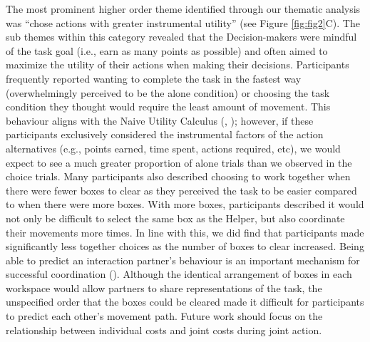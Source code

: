 \documentclass[
  man,
  floatsintext,
  longtable,
  nolmodern,
  notxfonts,
  notimes,
  colorlinks=true,linkcolor=blue,citecolor=blue,urlcolor=blue]{apa7}
\begin{document}
The most prominent higher order theme identified through our thematic
analysis was ``chose actions with greater instrumental utility'' (see
Figure \ref{fig:fig2}C). The sub themes within this category revealed
that the Decision-makers were mindful of the task goal (i.e., earn as
many points as possible) and often aimed to maximize the utility of
their actions when making their decisions. Participants frequently
reported wanting to complete the task in the fastest way (overwhelmingly
perceived to be the alone condition) or choosing the task condition they
thought would require the least amount of movement. This behaviour
aligns with the Naive Utility Calculus
(,
); however, if these participants
exclusively considered the instrumental factors of the action
alternatives (e.g., points earned, time spent, actions required, etc),
we would expect to see a much greater proportion of alone trials than we
observed in the choice trials. Many participants also described choosing
to work together when there were fewer boxes to clear as they perceived
the task to be easier compared to when there were more boxes. With more
boxes, participants described it would not only be difficult to select
the same box as the Helper, but also coordinate their movements more
times. In line with this, we did find that participants made
significantly less together choices as the number of boxes to clear
increased. Being able to predict an interaction partner's behaviour is
an important mechanism for successful coordination
(). Although the identical
arrangement of boxes in each workspace would allow partners to share
representations of the task, the unspecified order that the boxes could
be cleared made it difficult for participants to predict each other's
movement path. Future work should focus on the relationship between
individual costs and joint costs during joint action.
\end{document}

